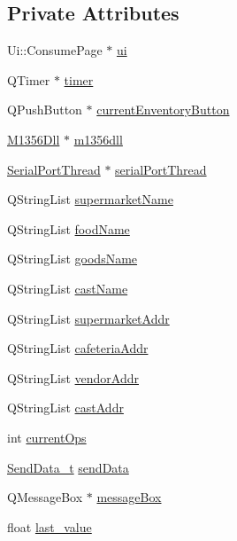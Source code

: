 \subsection*{Private Attributes}
\begin{DoxyCompactItemize}
\item 
Ui\+::\+Consume\+Page $\ast$ \mbox{\hyperlink{class_consume_page_a985f62c214ee04ab5a32826a2c01670a}{ui}}
\item 
Q\+Timer $\ast$ \mbox{\hyperlink{class_consume_page_a2d862691698552503b8874e7b6ab6d78}{timer}}
\item 
Q\+Push\+Button $\ast$ \mbox{\hyperlink{class_consume_page_ae32203479a3c7899b8c84f9c8390522f}{current\+Enventory\+Button}}
\item 
\mbox{\hyperlink{class_m1356_dll}{M1356\+Dll}} $\ast$ \mbox{\hyperlink{class_consume_page_a92f39f3e65ef11f9a99dfe9821bc2042}{m1356dll}}
\item 
\mbox{\hyperlink{class_serial_port_thread}{Serial\+Port\+Thread}} $\ast$ \mbox{\hyperlink{class_consume_page_ae29d14c1d1d1ce6e6281a2dec3ade6a0}{serial\+Port\+Thread}}
\item 
Q\+String\+List \mbox{\hyperlink{class_consume_page_ad679cfb8a1b8af73fc6f196ea387f7f4}{supermarket\+Name}}
\item 
Q\+String\+List \mbox{\hyperlink{class_consume_page_aa6871eb3b3d2065e79daf26a1685fdd2}{food\+Name}}
\item 
Q\+String\+List \mbox{\hyperlink{class_consume_page_aede14bdd9eb4b1191a557059abf83062}{goods\+Name}}
\item 
Q\+String\+List \mbox{\hyperlink{class_consume_page_a1dd56d09c71504247793ba91be860270}{cast\+Name}}
\item 
Q\+String\+List \mbox{\hyperlink{class_consume_page_a9df3baec8176e9c23c9c80cdabaf7274}{supermarket\+Addr}}
\item 
Q\+String\+List \mbox{\hyperlink{class_consume_page_a7cfd5d301069ce79ad431d89201b1703}{cafeteria\+Addr}}
\item 
Q\+String\+List \mbox{\hyperlink{class_consume_page_afbdd27b55a3286494a4b5b460d7f76f6}{vendor\+Addr}}
\item 
Q\+String\+List \mbox{\hyperlink{class_consume_page_a5f32182a0c6a200572cbe6a3205cfa82}{cast\+Addr}}
\item 
int \mbox{\hyperlink{class_consume_page_aba7dff446b4145fe69ee3cc75c459d9d}{current\+Ops}}
\item 
\mbox{\hyperlink{struct_send_data__t}{Send\+Data\+\_\+t}} \mbox{\hyperlink{class_consume_page_a708a20eabb2c5c297efd86b6ab6b9e5d}{send\+Data}}
\item 
Q\+Message\+Box $\ast$ \mbox{\hyperlink{class_consume_page_a873e137bb91e921fb86363de0a298d2b}{message\+Box}}
\item 
float \mbox{\hyperlink{class_consume_page_ae863ea00b582389d2ab9e8472b84a18a}{last\+\_\+value}}
\end{DoxyCompactItemize}


